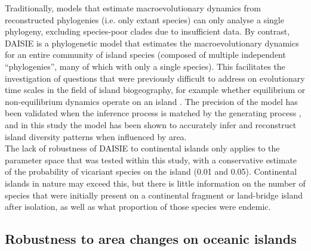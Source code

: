 \documentclass{article}
\begin{document}
Traditionally, models that estimate macroevolutionary dynamics from reconstructed phylogenies (i.e. only extant species) can only analyse a single phylogeny, excluding species-poor clades due to insufficient data. By contrast, DAISIE is a phylogenetic model that estimates the macroevolutionary dynamics for an entire community of island species (composed of multiple independent “phylogenies”, many of which with only a single species). This facilitates the investigation of questions that were previously difficult to address on evolutionary time scales in the field of island biogeography, for example whether equilibrium or non-equilibrium dynamics operate on an island \citep{valente_equilibrium_2015}. The precision of the model has been validated when the inference process is matched by the generating process \citep{valente_equilibrium_2015, valente_recent_2017, valente_using_2018}, and in this study the model has been shown to accurately infer and reconstruct island diversity patterns when influenced by area. \\

The lack of robustness of DAISIE to continental islands only applies to the parameter space that was tested within this study, with a conservative estimate of the probability of vicariant species on the island (0.01 and 0.05). Continental islands in nature may exceed this, but there is little information on the number of species that were initially present on a continental fragment or land-bridge island after isolation, as well as what proportion of those species were endemic. 

\subsection*{Robustness to area changes on oceanic islands}
\end{document}
